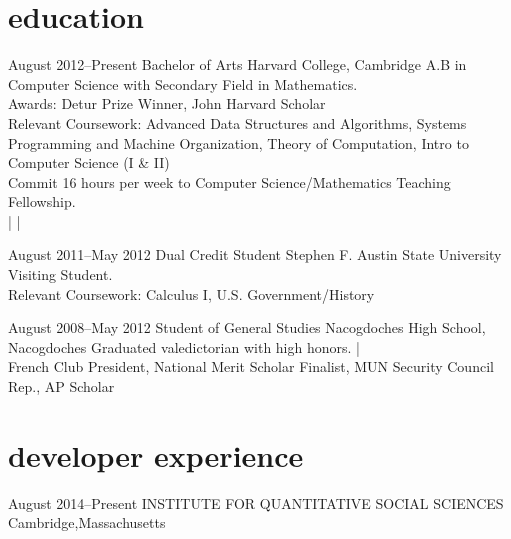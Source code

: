 \documentclass[]{friggeri-cv} %
\begin{document}
\section{education}

\entry
{August 2012--Present}
{Bachelor {\normalfont of Arts}}
{Harvard College, Cambridge}
{A.B in Computer Science with Secondary Field in Mathematics.\\
Awards: Detur Prize Winner, John Harvard Scholar \\
Relevant Coursework: Advanced Data Structures and Algorithms,  Systems Programming and Machine Organization, Theory of Computation, Intro to Computer Science (I \& II)\\
Commit 16 hours per week to Computer Science/Mathematics Teaching Fellowship.\\
 |
 | 
}

\begin{detailed}
\entry
{August 2011--May 2012}
{Dual {\normalfont Credit Student}}
{Stephen F. Austin State University}
{Visiting Student. \\
Relevant Coursework: Calculus I, U.S. Government/History \\
}
\end{detailed}

\entry
{August 2008--May 2012}
{Student {\normalfont of General Studies}}
{Nacogdoches High School, Nacogdoches}
{Graduated valedictorian with high honors.  | \\
French Club President, National Merit Scholar Finalist, MUN Security Council Rep., AP Scholar}



\section{developer experience}

\entry
{August 2014--Present}
{INSTITUTE FOR QUANTITATIVE SOCIAL SCIENCES}
{Cambridge,Massachusetts}
{}
\end{document}
